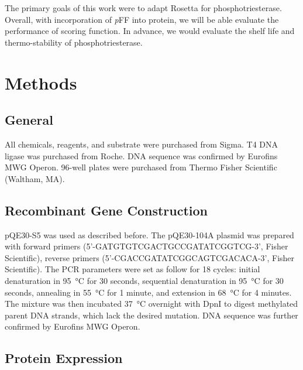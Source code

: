 \begin{refsection}
The primary goals of this work were to adapt Rosetta for phosphotriesterase.
Overall, with incorporation of \emph{p}FF into protein, we will be able
evaluate the performance of scoring function. In advance, we would evaluate the
shelf life and thermo-stability of phosphotriesterase.

\section{Methods}

\subsection{General}

All chemicals, reagents, and substrate were purchased from Sigma. T4 DNA ligase
was purchased from Roche. DNA sequence was confirmed by Eurofins MWG Operon.
96-well plates were purchased from Thermo Fisher Scientific (Waltham, MA).

\subsection{Recombinant Gene Construction}

pQE30-S5 was used as described before.\cite{Baker2011b} The pQE30-104A plasmid
was prepared with forward primers (5’-GATGTGTCGACTGCCGATATCGGTCG-3’, Fisher
Scientific), reverse primers (5’-CGACCGATATCGGCAGTCGACACA-3’, Fisher
Scientific). The PCR parameters were set as follow for 18 cycles: initial
denaturation in \SI{95}{\celsius} for 30 seconds, sequential denaturation in
\SI{95}{\celsius} for 30 seconds, annealing in \SI{55}{\celsius} for 1 minute,
and extension in \SI{68}{\celsius} for 4 minutes. The mixture was then
incubated \SI{37}{\celsius} overnight with DpnI to digest methylated parent DNA
strands, which lack the desired mutation. DNA sequence was further confirmed by
Eurofins MWG Operon.

\subsection{Protein Expression}
\label{sec:protein-expression-method}


\end{refsection}
